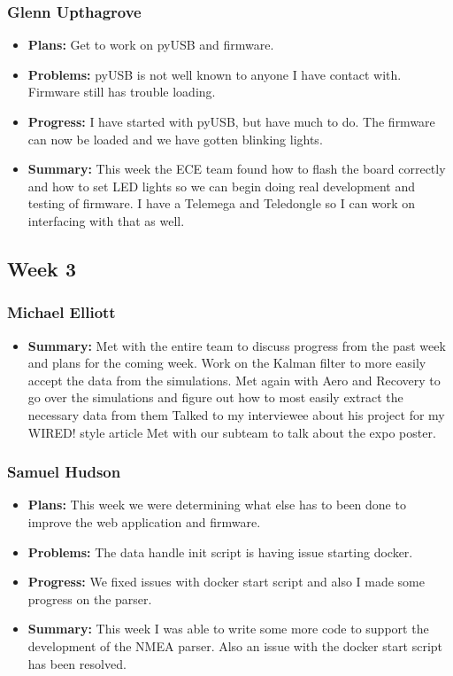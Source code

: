 \documentclass[onecolumn, draftclsnofoot,10pt, compsoc]{IEEEtran}
\begin{document}
\subsubsection{Glenn Upthagrove}
\begin {itemize}
 \item \textbf{Plans: }Get to work on pyUSB and firmware. 
 \item \textbf{Problems: }pyUSB is not well known to anyone I have contact with. Firmware still has trouble loading. 
 \item \textbf{Progress: }I have started with pyUSB, but have much to do. The firmware can now be loaded and we have gotten blinking lights.  
 \item \textbf{Summary: }This week the ECE team found how to flash the board correctly and how to set LED lights so we can begin doing real development and testing of firmware. I have a Telemega and Teledongle so I can work on interfacing with that as well.  
\end {itemize}

\subsection{Week 3}
\subsubsection{Michael Elliott}
\begin {itemize}
 \item \textbf{Summary: }Met with the entire team to discuss progress from the past week and
plans for the coming week.
Work on the Kalman filter to more easily accept the data from the simulations.
Met again with Aero and Recovery to go over the simulations and figure
out how to most easily extract the necessary data from them
Talked to my interviewee about his project for my WIRED! style article
Met with our subteam to talk about the expo poster.
\end{itemize}
\subsubsection{Samuel Hudson}
\begin {itemize}
 \item \textbf{Plans: }This week we were determining what else has to been done to improve the web application and firmware. 
 \item \textbf{Problems: }The data handle init script is having issue starting docker.
 \item \textbf{Progress: }We fixed issues with docker start script and also I made some progress on the parser.
 \item \textbf{Summary: }This week I was able to write some more code to support the development of the NMEA parser. Also an issue with the docker start script has been resolved.
\end {itemize}
\end{document}
